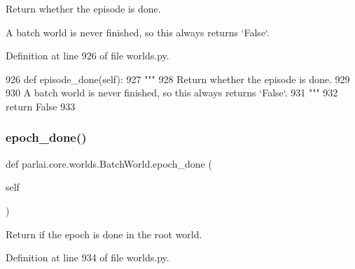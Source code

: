 \begin{DoxyVerb}Return whether the episode is done.

A batch world is never finished, so this always returns `False`.
\end{DoxyVerb}
 

Definition at line 926 of file worlds.\+py.


\begin{DoxyCode}
926     \textcolor{keyword}{def }episode\_done(self):
927         \textcolor{stringliteral}{"""}
928 \textcolor{stringliteral}{        Return whether the episode is done.}
929 \textcolor{stringliteral}{}
930 \textcolor{stringliteral}{        A batch world is never finished, so this always returns `False`.}
931 \textcolor{stringliteral}{        """}
932         \textcolor{keywordflow}{return} \textcolor{keyword}{False}
933 
\end{DoxyCode}
\mbox{\label{classparlai_1_1core_1_1worlds_1_1BatchWorld_a006891b1446ef6e593edda1c91cab809}} 
\subsubsection{\texorpdfstring{epoch\+\_\+done()}{epoch\_done()}}
{\footnotesize\ttfamily def parlai.\+core.\+worlds.\+Batch\+World.\+epoch\+\_\+done (\begin{DoxyParamCaption}\item[{}]{self }\end{DoxyParamCaption})}

\begin{DoxyVerb}Return if the epoch is done in the root world.
\end{DoxyVerb}
 

Definition at line 934 of file worlds.\+py.



